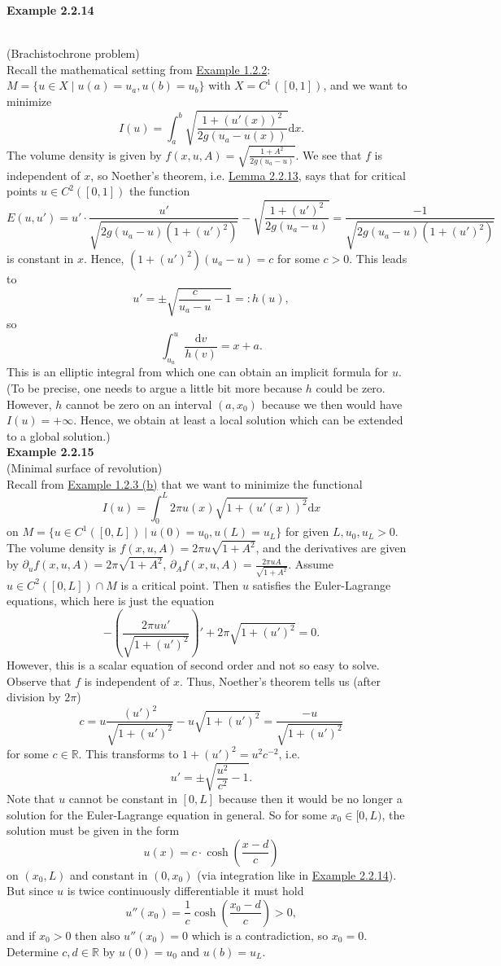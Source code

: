 \hypertarget{example_2_2_14}{\textbf{Example 2.2.14}}\\
(Brachistochrone problem)\\
Recall the mathematical setting from \hyperlink{example_1_2_2}{Example 1.2.2}: $M=\{u\in X\mid u(a)=u_a,u(b)=u_b\}$ with $X=C^1([0,1])$, and we want to minimize
\[I(u)=\int_a^b{\sqrt{\frac{1+(u'(x))^2}{2g(u_a-u(x))}}\mathrm{d}x}.\]
The volume density is given by $f(x,u,A)=\sqrt{\frac{1+A^2}{2g(u_a-u)}}$. We see that $f$ is independent of $x$, so Noether's theorem, i.e. \hyperlink{lemma_2_2_13}{Lemma 2.2.13}, says that for critical points $u\in C^2([0,1])$ the function
\[E(u,u')=u'\cdot\frac{u'}{\sqrt{2g(u_a-u)(1+(u')^2)}}-\sqrt{\frac{1+(u')^2}{2g(u_a-u)}}=\frac{-1}{\sqrt{2g(u_a-u)(1+(u')^2)}}\]
is constant in $x$. Hence, $(1+(u')^2)(u_a-u)=c$ for some $c>0$. This leads to
\[u'=\pm\sqrt{\frac{c}{u_a-u}-1}=:h(u),\]
so
\[\int_{u_a}^u{\frac{\mathrm{d}v}{h(v)}}=x+a.\]
This is an elliptic integral from which one can obtain an implicit formula for $u$. (To be precise, one needs to argue a little bit more because $h$ could be zero. However, $h$ cannot be zero on an interval $(a,x_0)$ because we then would have $I(u)=+\infty$. Hence, we obtain at least a local solution which can be extended to a global solution.)\\[11pt]

\textbf{Example 2.2.15}\\
(Minimal surface of revolution)\\
Recall from \hyperlink{example_1_2_3}{Example 1.2.3 (b)} that we want to minimize the functional
\[I(u)=\int_0^L{2\pi u(x)\sqrt{1+(u'(x))^2}\mathrm{d}x}\]
on $M=\{u\in C^1([0,L])\mid u(0)=u_0,u(L)=u_L\}$ for given $L,u_0,u_L>0$. The volume density is $f(x,u,A)=2\pi u\sqrt{1+A^2}$, and the derivatives are given by $\partial_uf(x,u,A)=2\pi\sqrt{1+A^2}$, $\partial_Af(x,u,A)=\frac{2\pi uA}{\sqrt{1+A^2}}$. Assume $u\in C^2([0,L])\cap M$ is a critical point. Then $u$ satisfies the Euler-Lagrange equations, which here is just the equation
\[-\left(\frac{2\pi uu'}{\sqrt{1+(u')^2}}\right)'+2\pi\sqrt{1+(u')^2}=0.\]
However, this is a scalar equation of second order and not so easy to solve. Observe that $f$ is independent of $x$. Thus, Noether's theorem tells us (after division by $2\pi$)
\[c=u\frac{(u')^2}{\sqrt{1+(u')^2}}-u\sqrt{1+(u')^2}=\frac{-u}{\sqrt{1+(u')^2}}\]
for some $c\in\mathbb{R}$. This transforms to $1+(u')^2=u^2c^{-2}$, i.e.
\[u'=\pm\sqrt{\frac{u^2}{c^2}-1}.\]
Note that $u$ cannot be constant in $[0,L]$ because then it would be no longer a solution for the Euler-Lagrange equation in general. So for some $x_0\in[0,L)$, the solution must be given in the form
\[u(x)=c\cdot\cosh\left(\frac{x-d}{c}\right)\]
on $(x_0,L)$ and constant in $(0,x_0)$ (via integration like in \hyperlink{example_2_2_14}{Example 2.2.14}). But since $u$ is twice continuously differentiable it must hold
\[u''(x_0)=\frac{1}{c}\cosh\left(\frac{x_0-d}{c}\right)>0,\]
and if $x_0>0$ then also $u''(x_0)=0$ which is a contradiction, so $x_0=0$. Determine $c,d\in\mathbb{R}$ by $u(0)=u_0$ and $u(b)=u_L$.